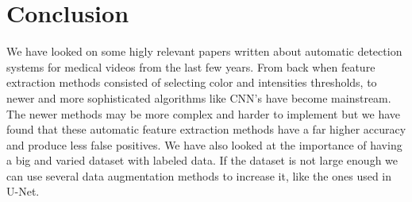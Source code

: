 \documentclass[thesis.tex]{subfiles}
\begin{document}
\chapter{Conclusion} \label{conclusion}

We have looked on some higly relevant papers written about automatic detection systems for medical videos from the last few years. From back when feature extraction methods consisted of selecting color and intensities thresholds, to newer and more sophisticated algorithms like CNN's have become mainstream. The newer methods may be more complex and harder to implement but we have found that these automatic feature extraction methods have a far higher accuracy and produce less false positives. We have also looked at the importance of having a big and varied dataset with labeled data. If the dataset is not large enough we can use several data augmentation methods to increase it, like the ones used in U-Net. 
\end{document}
